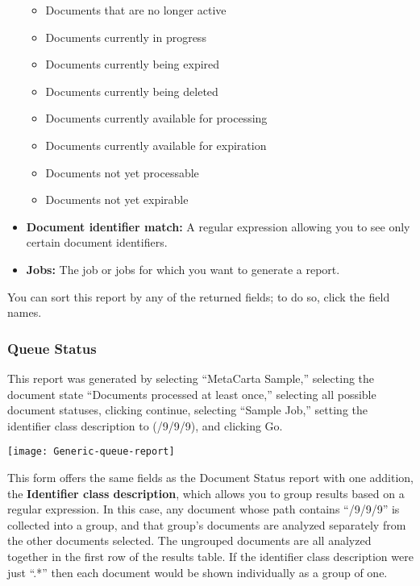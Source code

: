 \begin{changemargin}{1.5in}{0in}
\begin{itemize}
\begin{itemize}

\item Documents that are no longer active

\item Documents currently in progress

\item Documents currently being expired

\item Documents currently being deleted

\item Documents currently available for processing

\item Documents currently available for expiration

\item Documents not yet processable

\item Documents not yet expirable

\end{itemize}

\item \textbf{Document identifier match:} A regular expression allowing
you to see only certain document identifiers.

\item \textbf{Jobs:} The job or jobs for which you want to generate
a report.

\end{itemize}

You can sort this report by any of the returned fields; to do so,
click the field names.

\subsubsection{Queue Status}

This report was generated by selecting ``MetaCarta Sample,'' selecting
the document state ``Documents processed at least once,'' selecting all
possible document statuses, clicking continue, selecting ``Sample Job,''
setting the identifier class description to (/9/9/9), and clicking Go.

\texttt{[image: Generic-queue-report]}

This form offers the same fields as the Document Status report with
one addition, the \textbf{Identifier class description}, which allows
you to group results based on a regular expression. In this case, any
document whose path contains ``/9/9/9'' is collected into a group, and
that group's documents are analyzed  separately from the other documents
selected. The ungrouped documents are all analyzed together in the first
row of the results table. If the identifier class description were just
``.*'' then each document would be shown individually as a group of one.


\end{changemargin}
